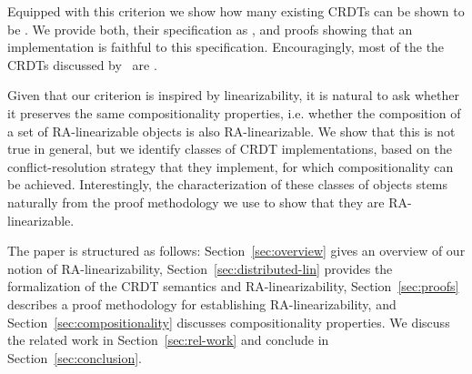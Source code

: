 Equipped with this criterion we show how many existing CRDTs can be
shown to be \crdtlinearizable{}.
%
We provide both, their specification as \CRDTLinshort{}, and proofs
showing that an implementation is faithful to this specification.
%
Encouragingly, most of the the CRDTs discussed by~\citet{ShapiroPBZ11}
are \crdtlinearizable{}.

Given that our criterion is inspired by
linearizability, it is natural to ask whether it
preserves the same compositionality properties, i.e.
whether the composition of a set of RA-linearizable objects is also RA-linearizable.
%
We show that this is not true in general, but we identify classes of
CRDT implementations, based on the conflict-resolution strategy that
they implement, for which compositionality can be achieved. Interestingly, the characterization of these 
classes of objects stems naturally from the proof methodology we use to show that they are RA-linearizable.


The paper is structured as follows:
Section~\ref{sec:overview} gives an overview of our notion of RA-linearizability, Section~\ref{sec:distributed-lin} provides the formalization of the CRDT semantics and RA-linearizability, Section~\ref{sec:proofs} describes a proof methodology for establishing RA-linearizability, and Section~\ref{sec:compositionality} discusses compositionality properties. We discuss the related work in Section~\ref{sec:rel-work} and conclude in Section~\ref{sec:conclusion}.





